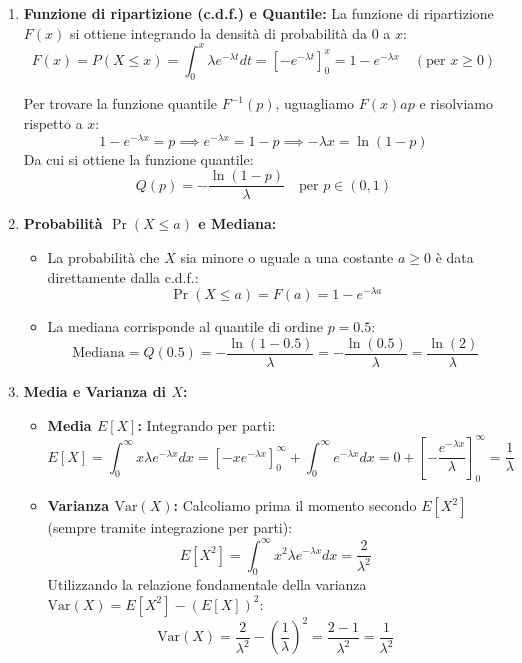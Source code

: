 \documentclass[
]{article}
\providecommand{\tightlist}{%
  \setlength{\itemsep}{0pt}\setlength{\parskip}{0pt}}
\begin{document}
\begin{enumerate}
\def\labelenumi{\arabic{enumi}.}
\item
  \textbf{Funzione di ripartizione (c.d.f.) e Quantile:} La funzione di
  ripartizione \(F(x)\) si ottiene integrando la densità di probabilità
  da \(0\) a \(x\):
  \[F(x) = P(X \le x) = \int_{0}^{x} \lambda e^{-\lambda t} dt = \left[ -e^{-\lambda t} \right]_{0}^{x} = 1 - e^{-\lambda x} \quad (\text{per } x \ge 0)\]

  Per trovare la funzione quantile \(F^{-1}(p)\), uguagliamo
  \(F(x) a p\) e risolviamo rispetto a \(x\):
  \[1 - e^{-\lambda x} = p \implies e^{-\lambda x} = 1 - p \implies -\lambda x = \ln(1-p)\]
  Da cui si ottiene la funzione quantile:
  \[Q(p) = -\frac{\ln(1-p)}{\lambda} \quad \text{per } p \in (0,1)\]
\item
  \textbf{Probabilità \(\Pr(X \le a)\) e Mediana:}

  \begin{itemize}
  \tightlist
  \item
    La probabilità che \(X\) sia minore o uguale a una costante
    \(a \ge 0\) è data direttamente dalla c.d.f.:
    \[\Pr(X \le a) = F(a) = 1 - e^{-\lambda a}\]
  \item
    La mediana corrisponde al quantile di ordine \(p = 0.5\):
    \[\text{Mediana} = Q(0.5) = -\frac{\ln(1 - 0.5)}{\lambda} = -\frac{\ln(0.5)}{\lambda} = \frac{\ln(2)}{\lambda}\]
  \end{itemize}
\item
  \textbf{Media e Varianza di \(X\):}

  \begin{itemize}
  \tightlist
  \item
    \textbf{Media \(E[X]\):} Integrando per parti:
    \[E[X] = \int_{0}^{\infty} x \lambda e^{-\lambda x} dx = \left[ -x e^{-\lambda x} \right]_{0}^{\infty} + \int_{0}^{\infty} e^{-\lambda x} dx = 0 + \left[ -\frac{e^{-\lambda x}}{\lambda} \right]_{0}^{\infty} = \frac{1}{\lambda}\]
  \item
    \textbf{Varianza \(\text{Var}(X)\):} Calcoliamo prima il momento
    secondo \(E[X^2]\) (sempre tramite integrazione per parti):
    \[E[X^2] = \int_{0}^{\infty} x^2 \lambda e^{-\lambda x} dx = \frac{2}{\lambda^2}\]
    Utilizzando la relazione fondamentale della varianza
    \(\text{Var}(X) = E[X^2] - (E[X])^2\):
    \[\text{Var}(X) = \frac{2}{\lambda^2} - \left(\frac{1}{\lambda}\right)^2 = \frac{2 - 1}{\lambda^2} = \frac{1}{\lambda^2}\]
  \end{itemize}
\end{enumerate}
\end{document}
